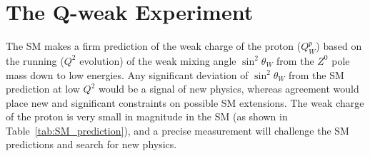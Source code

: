 \section{The Q-weak Experiment}
\label{The Q-weak Experiment}

The SM makes a firm prediction of the weak charge of the proton ($Q^{p}_{W}$) based on the running ($Q^{2}$ evolution) of the weak mixing angle $\sin^{2}\theta_{W}$ from the $Z^{0}$ pole mass down to low energies. Any significant deviation of $\sin^{2}\theta_{W}$ from the SM prediction at low $Q^{2}$ would be a signal of new physics, whereas agreement would place new and significant constraints on possible SM extensions. 
The weak charge of the proton is very small in magnitude in the SM (as shown in Table~\ref{tab:SM_prediction}), and a precise measurement will challenge the SM predictions and search for new physics. 


%
%

